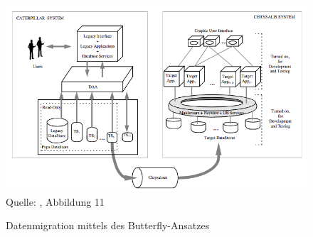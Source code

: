 \begin{figure}
	\centering
	\caption{Datenmigration mittels des Butterfly-Ansatzes}
	\label{pic:datemigration_Butterfly}
	\includegraphics[width=1.0\textwidth]{../images/vorgehensweisen_fig_01.png} \\
	\tiny Quelle: \citep[S.~6]{wuLawless-1997}, Abbildung 11
\end{figure}


